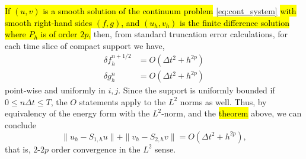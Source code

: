 \hl{If $(u,v)$ is a smooth solution of the continuum problem} \ref{eq:cont_system}
\hl{with smooth right-hand sides $(f,g)$, and $(u_h,v_h)$ is the finite difference 
solution where $P_h$ is of order $2p$,} then, from standard truncation error 
calculations, for each time slice of compact support we have,
\begin{equation*}
\begin{split}
	\delta f_h^{n+1/2} &= O( \Delta t^2+h^{2p})\\
	\delta g_h^{n} &= O( \Delta t^2+h^{2p})
\end{split} 
\end{equation*}
point-wise and uniformly in $i,j$. 
Since the support is uniformly bounded if $0\le n\Delta t \le T$, 
the $O$ statements apply to the $L^2$ norms as well.
Thus, by equivalency of the energy form with the $L^2$-norm, and the \hl{theorem} above, 
we can conclude
\[
	\|u_h-S_{1,h}u\| + \|v_h-S_{2,h}v\| = O(\Delta t^2+h^{2p}),
\]
that is, $2$-$2p$ order convergence in the $L^2$ sense.


%
%
%
%

